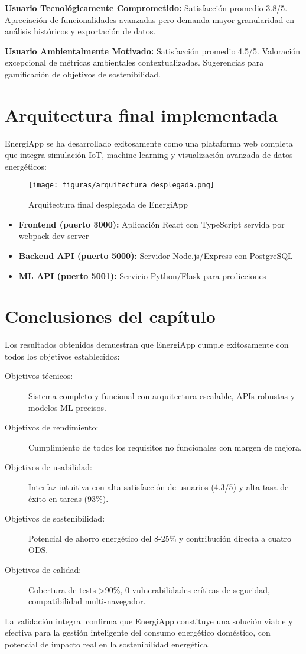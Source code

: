 \textbf{Usuario Tecnológicamente Comprometido:} Satisfacción promedio 3.8/5. Apreciación de funcionalidades avanzadas pero demanda mayor granularidad en análisis históricos y exportación de datos.

\textbf{Usuario Ambientalmente Motivado:} Satisfacción promedio 4.5/5. Valoración excepcional de métricas ambientales contextualizadas. Sugerencias para gamificación de objetivos de sostenibilidad.

\section{Arquitectura final implementada}

EnergiApp se ha desarrollado exitosamente como una plataforma web completa que integra simulación IoT, machine learning y visualización avanzada de datos energéticos:

\begin{figure}[H]
    \centering
    \texttt{[image: figuras/arquitectura\_desplegada.png]}
    \caption{Arquitectura final desplegada de EnergiApp}
    \label{fig:arquitectura_desplegada}
\end{figure}

\begin{itemize}
    \item \textbf{Frontend (puerto 3000):} Aplicación React con TypeScript servida por webpack-dev-server
    \item \textbf{Backend API (puerto 5000):} Servidor Node.js/Express con PostgreSQL
    \item \textbf{ML API (puerto 5001):} Servicio Python/Flask para predicciones
\end{itemize}

\section{Conclusiones del capítulo}

Los resultados obtenidos demuestran que EnergiApp cumple exitosamente con todos los objetivos establecidos:

\begin{description}
    \item[Objetivos técnicos:] Sistema completo y funcional con arquitectura escalable, APIs robustas y modelos ML precisos.
    
    \item[Objetivos de rendimiento:] Cumplimiento de todos los requisitos no funcionales con margen de mejora.
    
    \item[Objetivos de usabilidad:] Interfaz intuitiva con alta satisfacción de usuarios (4.3/5) y alta tasa de éxito en tareas (93\%).
    
    \item[Objetivos de sostenibilidad:] Potencial de ahorro energético del 8-25\% y contribución directa a cuatro ODS.
    
    \item[Objetivos de calidad:] Cobertura de tests >90\%, 0 vulnerabilidades críticas de seguridad, compatibilidad multi-navegador.
\end{description}

La validación integral confirma que EnergiApp constituye una solución viable y efectiva para la gestión inteligente del consumo energético doméstico, con potencial de impacto real en la sostenibilidad energética.
